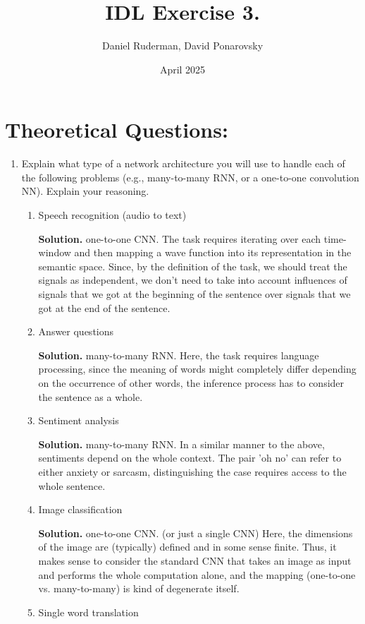 \documentclass{article}
\title{IDL Exercise 3.}
\author{Daniel Ruderman, David Ponarovsky}
\date{April 2025}
\begin{document}
\maketitle

\section{Theoretical Questions:}

\begin{enumerate}
  \item Explain what type of a network architecture you will use to handle each of the following problems (e.g., many-to-many RNN, or a one-to-one convolution NN). Explain your reasoning. 
    \begin{enumerate}
\item Speech recognition (audio to text) 


  \textbf{Solution.} one-to-one CNN. The task requires iterating over each time-window and then mapping a wave function into its representation in the semantic space. Since, by the definition of the task, we should treat the signals as independent, we don't need to take into account influences of signals that we got at the beginning of the sentence over signals that we got at the end of the sentence.
\item Answer questions


  \textbf{Solution.} many-to-many RNN.  Here, the task requires language processing, since the meaning of words might completely differ depending on the occurrence of other words, the inference process has to consider the sentence as a whole.
\item Sentiment analysis


        \textbf{Solution.} many-to-many RNN. In a similar manner to the above, sentiments depend on the whole context. The pair 'oh no' can refer to either anxiety or sarcasm, distinguishing the case requires access to the whole sentence.
\item Image classification


  \textbf{Solution.} one-to-one CNN. (or just a single CNN) Here, the dimensions of the image are (typically) defined and in some sense finite. Thus, it makes sense to consider the standard CNN that takes an image as input and performs the whole computation alone, and the mapping (one-to-one vs. many-to-many) is kind of degenerate itself.
\item Single word translation



\end{enumerate}
\end{enumerate}
\end{document}
